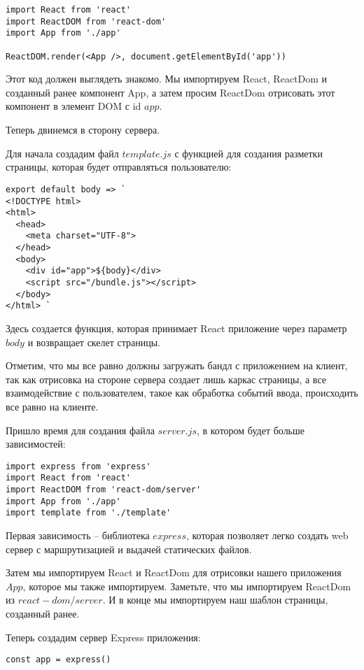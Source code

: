 \begin{lstlisting}
import React from 'react'
import ReactDOM from 'react-dom'
import App from './app'

ReactDOM.render(<App />, document.getElementById('app'))
\end{lstlisting}

Этот код должен выглядеть знакомо. Мы импортируем React, ReactDom и созданный ранее компонент App, а затем просим ReactDom отрисовать этот компонент в элемент DOM с id $app$.

Теперь двинемся в сторону сервера.

Для начала создадим файл $template.js$ с функцией для создания разметки страницы, которая будет отправляться пользователю:

\begin{lstlisting}
export default body => `
<!DOCTYPE html>
<html>
  <head>
    <meta charset="UTF-8">
  </head>
  <body>
    <div id="app">${body}</div>
    <script src="/bundle.js"></script>
  </body>
</html> `
\end{lstlisting}

Здесь создается функция, которая принимает React приложение через параметр $body$ и возвращает скелет страницы.

Отметим, что мы все равно должны загружать бандл с приложением на клиент, так как отрисовка на стороне сервера создает лишь каркас страницы, а все взаимодействие с пользователем, такое как обработка событий ввода, происходить все равно на клиенте.

Пришло время для создания файла $server.js$, в котором будет больше зависимостей:

\begin{lstlisting}
import express from 'express'
import React from 'react'
import ReactDOM from 'react-dom/server'
import App from './app'
import template from './template'
\end{lstlisting}

Первая зависимость -- библиотека $express$, которая позволяет легко создать web сервер с маршрутизацией и выдачей статических файлов.

Затем мы импортируем React и ReactDom для отрисовки нашего приложения $App$, которое мы также импортируем. Заметьте, что мы импортируем ReactDom из $react-dom/server$. И в конце мы импортируем наш шаблон страницы, созданный ранее.

Теперь создадим сервер Express приложения:

\begin{lstlisting}
const app = express()
\end{lstlisting}

